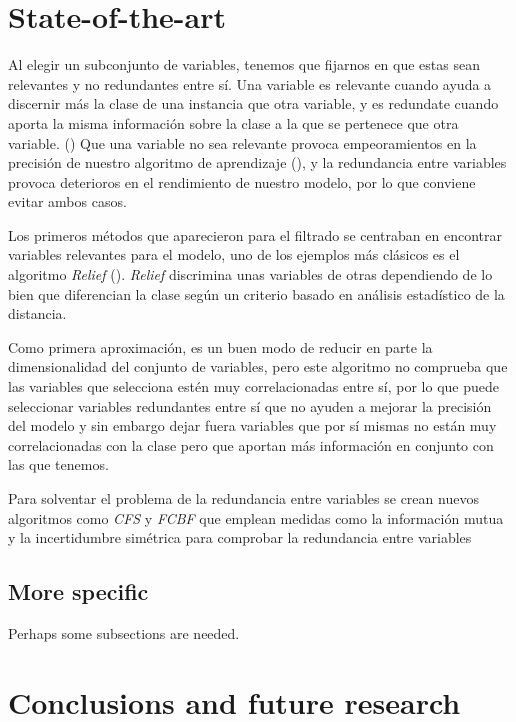 \documentclass[a4paper,11pt]{article}
\begin{document}
\section{State-of-the-art}

Al elegir un subconjunto de variables, tenemos que fijarnos en que estas sean relevantes y no redundantes entre sí. Una variable es relevante cuando ayuda a discernir más la clase de una instancia que otra variable, y es redundate cuando aporta la misma información sobre la clase a la que se pertenece que otra variable. (\cite{fast})
Que una variable no sea relevante provoca empeoramientos en la precisión de nuestro algoritmo de aprendizaje (\cite{john1994}), y la redundancia entre variables provoca deterioros en el rendimiento de nuestro modelo, por lo que conviene evitar ambos casos.

Los primeros métodos que aparecieron para el filtrado se centraban en encontrar variables relevantes para el modelo, uno de los ejemplos más clásicos es el algoritmo \textit{Relief} (\cite{kira1992}). \textit{Relief} discrimina unas variables de otras dependiendo de lo bien que diferencian la clase según un criterio basado en análisis estadístico de la distancia. 

Como primera aproximación, es un buen modo de reducir en parte la dimensionalidad del conjunto de variables, pero este algoritmo no comprueba que las variables que selecciona estén muy correlacionadas entre sí, por lo que puede seleccionar variables redundantes entre sí que no ayuden a mejorar la precisión del modelo y sin embargo dejar fuera variables que por sí mismas no están muy correlacionadas con la clase pero que aportan más información en conjunto con las que tenemos.

Para solventar el problema de la redundancia entre variables se crean nuevos algoritmos como \textit{CFS} y \textit{FCBF} que emplean medidas como la información mutua y la incertidumbre simétrica para comprobar la redundancia entre variables \cite{yu2004}

    \subsection{More specific}


Perhaps some subsections are needed.

\section{Conclusions and future research}
\end{document}
